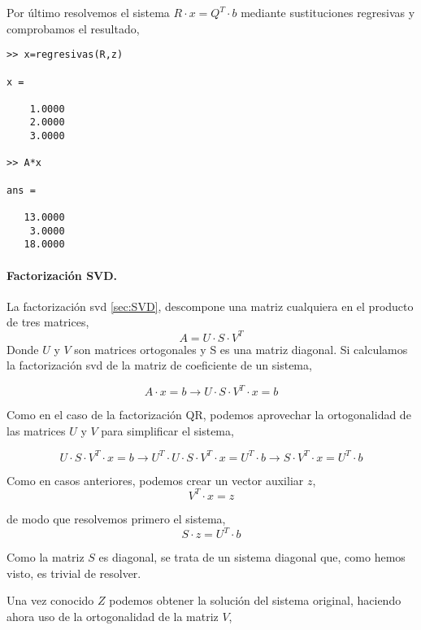 Por último resolvemos el sistema $R\cdot x= Q^T\cdot b$ mediante sustituciones regresivas y comprobamos el resultado,

\begin{verbatim}
>> x=regresivas(R,z)

x =

    1.0000
    2.0000
    3.0000

>> A*x

ans =

   13.0000
    3.0000
   18.0000
\end{verbatim}

\paragraph{Factorización SVD.} La  factorización svd \ref{sec:SVD}, descompone una matriz cualquiera en el producto de tres matrices,
\begin{equation*}
A=U\cdot S\cdot V^T
\end{equation*}
Donde $U$ y $V$ son matrices ortogonales y S es una matriz diagonal. Si calculamos la factorización svd de la matriz de coeficiente de un sistema,

\begin{equation*}
A\cdot x=b \rightarrow U\cdot S\cdot V^T\cdot x=b
\end{equation*}

Como en el caso de la factorización QR, podemos aprovechar la ortogonalidad de las matrices $U$ y $V$ para simplificar el sistema,

\begin{equation*}
U\cdot S\cdot V^T\cdot x=b \rightarrow U^T\cdot U\cdot S\cdot V^T \cdot x= U^T\cdot b \rightarrow S\cdot V^T \cdot x=U^T\cdot b
\end{equation*}

Como en casos anteriores, podemos crear un vector auxiliar $z$,
\begin{equation*}
V^T\cdot x=z
\end{equation*}

de modo que resolvemos primero el sistema,
\begin{equation*}
S\cdot z= U^T\cdot b
\end{equation*}

Como la matriz $S$ es diagonal, se trata de un sistema diagonal que, como hemos visto, es trivial de resolver.

Una vez conocido $Z$ podemos obtener la solución del sistema original, haciendo ahora uso de la ortogonalidad de la matriz $V$,

